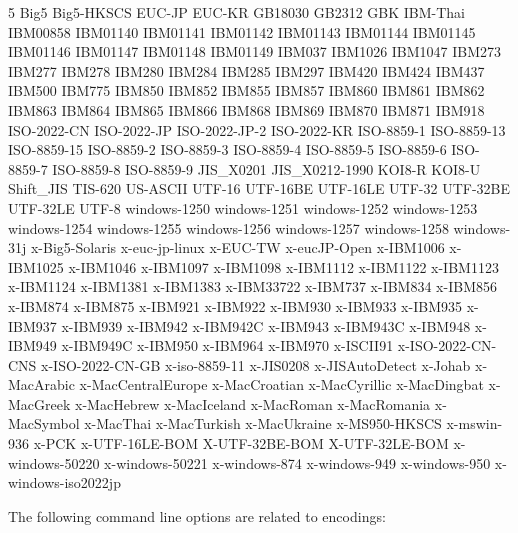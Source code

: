 \noindent
\begin{multicols}5\obeylines\scriptsize\parindent=0pt
  Big5
  Big5-HKSCS
  EUC-JP
  EUC-KR
  GB18030
  GB2312
  GBK
  IBM-Thai
  IBM00858
  IBM01140
  IBM01141
  IBM01142
  IBM01143
  IBM01144
  IBM01145
  IBM01146
  IBM01147
  IBM01148
  IBM01149
  IBM037
  IBM1026
  IBM1047
  IBM273
  IBM277
  IBM278
  IBM280
  IBM284
  IBM285
  IBM297
  IBM420
  IBM424
  IBM437
  IBM500
  IBM775
  IBM850
  IBM852
  IBM855
  IBM857
  IBM860
  IBM861
  IBM862
  IBM863
  IBM864
  IBM865
  IBM866
  IBM868
  IBM869
  IBM870
  IBM871
  IBM918
  ISO-2022-CN
  ISO-2022-JP
  ISO-2022-JP-2
  ISO-2022-KR
  ISO-8859-1
  ISO-8859-13
  ISO-8859-15
  ISO-8859-2
  ISO-8859-3
  ISO-8859-4
  ISO-8859-5
  ISO-8859-6
  ISO-8859-7
  ISO-8859-8
  ISO-8859-9
  JIS\_X0201
  JIS\_X0212-1990
  KOI8-R
  KOI8-U
  Shift\_JIS
  TIS-620
  US-ASCII
  UTF-16
  UTF-16BE
  UTF-16LE
  UTF-32
  UTF-32BE
  UTF-32LE
  UTF-8
  windows-1250
  windows-1251
  windows-1252
  windows-1253
  windows-1254
  windows-1255
  windows-1256
  windows-1257
  windows-1258
  windows-31j
  x-Big5-Solaris
  x-euc-jp-linux
  x-EUC-TW
  x-eucJP-Open
  x-IBM1006
  x-IBM1025
  x-IBM1046
  x-IBM1097
  x-IBM1098
  x-IBM1112
  x-IBM1122
  x-IBM1123
  x-IBM1124
  x-IBM1381
  x-IBM1383
  x-IBM33722
  x-IBM737
  x-IBM834
  x-IBM856
  x-IBM874
  x-IBM875
  x-IBM921
  x-IBM922
  x-IBM930
  x-IBM933
  x-IBM935
  x-IBM937
  x-IBM939
  x-IBM942
  x-IBM942C
  x-IBM943
  x-IBM943C
  x-IBM948
  x-IBM949
  x-IBM949C
  x-IBM950
  x-IBM964
  x-IBM970
  x-ISCII91
  x-ISO-2022-CN-CNS
  x-ISO-2022-CN-GB
  x-iso-8859-11
  x-JIS0208
  x-JISAutoDetect
  x-Johab
  x-MacArabic
  x-MacCentralEurope
  x-MacCroatian
  x-MacCyrillic
  x-MacDingbat
  x-MacGreek
  x-MacHebrew
  x-MacIceland
  x-MacRoman
  x-MacRomania
  x-MacSymbol
  x-MacThai
  x-MacTurkish
  x-MacUkraine
  x-MS950-HKSCS
  x-mswin-936
  x-PCK
  x-UTF-16LE-BOM
  X-UTF-32BE-BOM
  X-UTF-32LE-BOM
  x-windows-50220
  x-windows-50221
  x-windows-874
  x-windows-949
  x-windows-950
  x-windows-iso2022jp
\end{multicols}

The following command line options are related to encodings:

